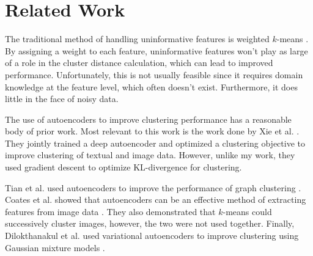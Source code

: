 \section{Related Work}
The traditional method of handling uninformative features is weighted $k$-means \cite{weighted}. By assigning a weight to each feature, uninformative features won't play as large of a role in the cluster distance calculation, which can lead to improved performance. Unfortunately, this is not usually feasible since it requires domain knowledge at the feature level, which often doesn't exist. Furthermore, it does little in the face of noisy data.

The use of autoencoders to improve clustering performance has a reasonable body of prior work. Most relevant to this work is the work done by Xie et al. \cite{deepcluster}. They jointly trained a deep autoencoder and optimized a clustering objective to improve clustering of textual and image data. However, unlike my work, they used gradient descent to optimize KL-divergence for clustering.  

Tian et al. used autoencoders to improve the performance of graph clustering \cite{graph}. Coates et al.  showed that autoencoders can be an effective method of extracting features from image data \cite{coates}. They also demonstrated that $k$-means could successively cluster images, however, the two were not used together. Finally, Dilokthanakul et al. used variational autoencoders to improve clustering using Gaussian mixture models \cite{gmm}.